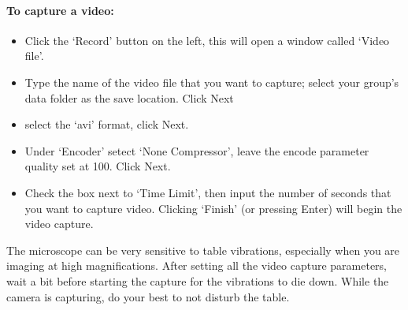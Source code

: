 \paragraph*{To capture a video:}
\begin{itemize}
\item Click the `Record' button on the left, this will open a window called `Video file'.
\item Type the name of the video file that you want to capture; select your group's data folder as the save location. Click Next
\item select the `avi' format, click Next.
\item Under `Encoder' setect `None Compressor', leave the encode parameter quality set at 100. Click Next.
\item Check the box next to `Time Limit', then input the number of seconds that you want to capture video. Clicking `Finish' (or pressing Enter) will begin the video capture.
\end{itemize}
The microscope can be very sensitive to table vibrations, especially when you are imaging at high magnifications. 
After setting all the video capture parameters, wait a bit before starting the capture for the vibrations to die down.
While the camera is capturing, do your best to not disturb the table.
